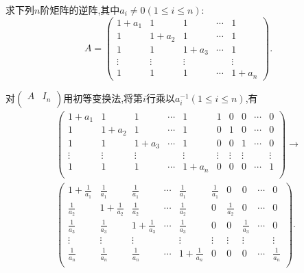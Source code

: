 \documentclass[../../main.tex]{subfiles}%
\begin{document}
\begin{example}\label{example2.3}
求下列\(n\)阶矩阵的逆阵,其中\(a_i \neq 0(1\leqslant  i\leqslant  n)\):
\[
A = 
\begin{pmatrix}
1 + a_1 & 1 & 1 & \cdots & 1 \\
1 & 1 + a_2 & 1 & \cdots & 1 \\
1 & 1 & 1 + a_3 & \cdots & 1 \\
\vdots & \vdots & \vdots & & \vdots \\
1 & 1 & 1 & \cdots & 1 + a_n
\end{pmatrix}.
\]
\end{example}
\begin{solution}

对\(\left( \begin{matrix}
A&		I_n\\
\end{matrix} \right) \)用初等变换法,将第\(i\)行乘以\(a_i^{-1}(1\leqslant  i\leqslant  n)\),有
\begin{gather*}
\left( \begin{matrix}
1+a_1&		1&		1&		\cdots&		1&		1&		0&		0&		\cdots&		0\\
1&		1+a_2&		1&		\cdots&		1&		0&		1&		0&		\cdots&		0\\
1&		1&		1+a_3&		\cdots&		1&		0&		0&		1&		\cdots&		0\\
\vdots&		\vdots&		\vdots&		&		\vdots&		\vdots&		\vdots&		\vdots&		&		\vdots\\
1&		1&		1&		\cdots&		1+a_n&		0&		0&		0&		\cdots&		1\\
\end{matrix} \right) \rightarrow 
\\
\left( \begin{matrix}
1+\frac{1}{a_1}&		\frac{1}{a_1}&		\frac{1}{a_1}&		\cdots&		\frac{1}{a_1}&		\frac{1}{a_1}&		0&		0&		\cdots&		0\\
\frac{1}{a_2}&		1+\frac{1}{a_2}&		\frac{1}{a_2}&		\cdots&		\frac{1}{a_2}&		0&		\frac{1}{a_2}&		0&		\cdots&		0\\
\frac{1}{a_3}&		\frac{1}{a_3}&		1+\frac{1}{a_3}&		\cdots&		\frac{1}{a_3}&		0&		0&		\frac{1}{a_3}&		\cdots&		0\\
\vdots&		\vdots&		\vdots&		&		\vdots&		\vdots&		\vdots&		\vdots&		&		\vdots\\
\frac{1}{a_n}&		\frac{1}{a_n}&		\frac{1}{a_n}&		\cdots&		1+\frac{1}{a_n}&		0&		0&		0&		\cdots&		\frac{1}{a_n}\\
\end{matrix} \right) .
\end{gather*}

\end{solution}
\end{document}
